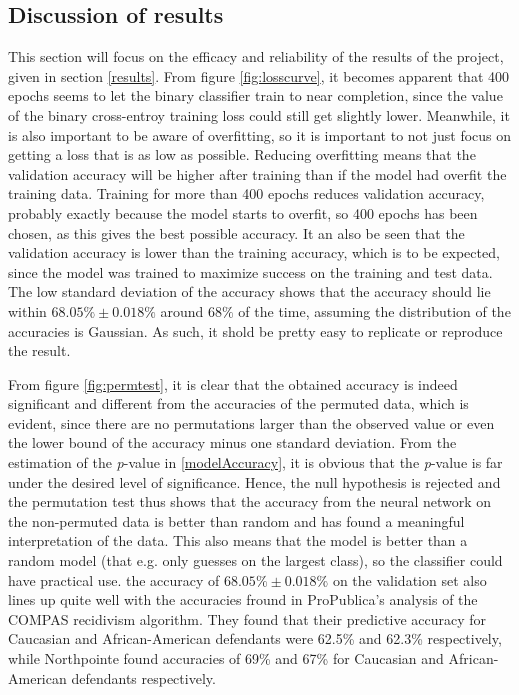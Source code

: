\documentclass[11pt, fleqn, titlepage]{article}
\begin{document}
	\subsection{Discussion of results}\label{discussionOfResults}
	This section will focus on the efficacy and reliability of the results of the project, given in section \ref{results}. From figure \ref{fig:losscurve}, it becomes apparent that 400 epochs seems to let the binary classifier train to near completion, since the value of the binary cross-entroy training loss could still get slightly lower. Meanwhile, it is also important to be aware of overfitting, so it is important to not just focus on getting a loss that is as low as possible. Reducing overfitting means that the validation accuracy will be higher after training than if the model had overfit the training data. Training for more than 400 epochs reduces validation accuracy, probably exactly because the model starts to overfit, so 400 epochs has been chosen, as this gives the best possible accuracy. It an also be seen that the validation accuracy is lower than the training accuracy, which is to be expected, since the model was trained to maximize success on the training and test data. The low standard deviation of the accuracy shows that the accuracy should lie within $68.05\% \pm 0.018\%$ around $68\%$ of the time, assuming the distribution of the accuracies is Gaussian. As such, it shold be pretty easy to replicate or reproduce the result.
	
	From figure \ref{fig:permtest}, it is clear that the obtained accuracy is indeed significant and different from the accuracies of the permuted data, which is evident, since there are no permutations larger than the observed value or even the lower bound of the accuracy minus one standard deviation. From the estimation of the \textit{p}-value in \ref{modelAccuracy}, it is obvious that the \textit{p}-value is far under the desired level of significance. Hence, the null hypothesis is rejected and the permutation test thus shows that the accuracy from the neural network on the non-permuted data is better than random and has found a meaningful interpretation of the data. This also means that the model is better than a random model (that e.g. only guesses on the largest class), so the classifier could have practical use. the accuracy of $68.05\% \pm 0.018\%$ on the validation set also lines up quite well with the accuracies fround in ProPublica's analysis of the COMPAS recidivism algorithm. They found that their predictive accuracy for Caucasian and African-American defendants were 62.5\% and 62.3\% respectively, while Northpointe found accuracies of 69\% and 67\% for Caucasian and African-American defendants respectively. \cite{propublicaAnalysis}
	
\end{document}
